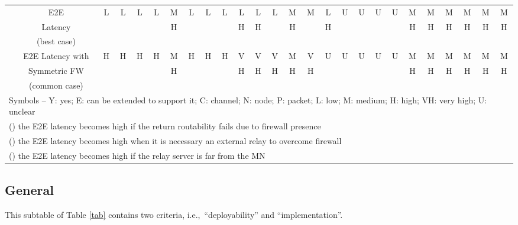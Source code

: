 \documentclass[preprint,12pt]{elsarticle}
\begin{document}
\begin{landscape}
\begin{table*}[t]
\begin{tabular}{|c|c|c|c|c|c|c|c|c|c|c|c|c|c|c|c|c|c|c|c|c|c|c|c|c|c|}
    & E2E & \multirow{2}{*}{L}  & \multirow{2}{*}{L} & 
	      \multirow{2}{*}{L} & \multirow{2}{*}{L} & M 
	      & \multirow{2}{*}{L} & 
	      \multirow{2}{*}{L} & \multirow{2}{*}{L} & L & 
	      L  & \multirow{2}{*}{L} & M & \multirow{2}{*}{M} & 
L & \multirow{2}{*}{U} & \multirow{2}{*}{U} & \multirow{2}{*}{U} & 
	      \multirow{2}{*}{U} 
	      & M & M & M & M & M & M\\
    & Latency & &  & & & H & & & & H &  H & & H & & H & & & & & H & H & H & H & H & H\\
    & (best case) &   &  &  &  &  &  & 
	       &  &   &  & 
	       & &  &  & & & & &
	       &  &  &  &  & \\
  \hhline{~-------------------------}
    & E2E Latency with & \multirow{3}{*}{H}  & \multirow{3}{*}{H} & 
	      \multirow{3}{*}{H} & \multirow{3}{*}{H} & M 
	      & \multirow{3}{*}{H} & 
	      \multirow{3}{*}{H} & \multirow{3}{*}{H} & V & 
V &  V & M & V &  \multirow{3}{*}{U} & \multirow{3}{*}{U} & \multirow{3}{*}{U} & \multirow{3}{*}{U} & \multirow{3}{*}{U} & M & M & M & M & M & M\\
    & Symmetric FW & & & &  & H & & & & H & H & H & H & H & & & & & & H & H & H & H & H & H\\
    & (common case) &  & &    &  &  &  & &  & & & & & & & & & & & & & &  &  &  \\
\hline
\hline
\multicolumn{26}{|l|}{Symbols -- Y: yes; E: can be extended to support it; C: channel; N: node; P: packet; L: low; M: medium; H: high; VH: very high; U: unclear}\\
\multicolumn{26}{|l|}{() the E2E latency becomes high if the return routability fails due to firewall presence}\\
\multicolumn{26}{|l|}{() the E2E latency becomes high when it is necessary an external relay to overcome firewall}\\
\multicolumn{26}{|l|}{() the E2E latency becomes high if the relay server is far from the MN}\\
\hline
\hline
\end{tabular}
\end{table*}
\restoregeometry
\end{landscape}


\subsection{General}

This subtable of Table \ref{tab} 
contains two criteria, i.e.,~``deployability'' and 
``implementation''. 
\end{document}
